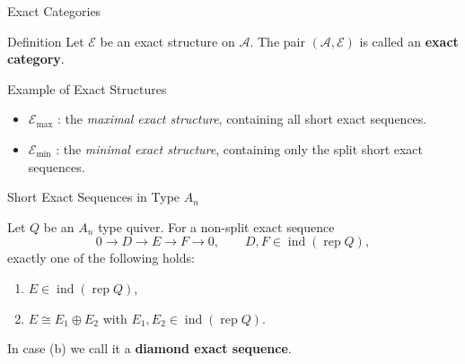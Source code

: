 \documentclass[t]{beamer}
\theoremstyle{plain}
\newcommand{\rep}{\operatorname{rep}}
\newcommand{\ind}{\operatorname{ind}}
\begin{document}
\begin{frame}{Exact Categories}
  \begin{block}{Definition}
    Let $\mathcal{E}$ be an exact structure on $\mathscr{A}$.  
    The pair $(\mathscr{A},\mathcal{E})$ is called an \textbf{exact category}.
  \end{block}
\pause
  \bigskip

  \begin{block}{Example of Exact Structures}
    \begin{itemize}
      \item $\mathcal{E}_{\max}$ : the \emph{maximal exact structure}, containing all short exact sequences.
      \pause
      \item $\mathcal{E}_{\min}$ : the \emph{minimal exact structure}, containing only the split short exact sequences.
    \end{itemize}
  \end{block}
\end{frame}


\begin{frame}{Short Exact Sequences in Type $A_n$}
\begin{theorem}
Let $Q$ be an $A_n$ type quiver.  
For a non-split exact sequence
\[
0 \longrightarrow D \longrightarrow E \longrightarrow F \longrightarrow 0,
\qquad D,F \in \ind(\rep Q),
\]
exactly one of the following holds:
\pause
\begin{enumerate}[label=(\alph*)]
  \item $E \in \ind(\rep Q)$, 
\pause
  \item $E \cong E_1 \oplus E_2$ with $E_1,E_2 \in \ind(\rep Q)$.
\end{enumerate}
\smallskip
\end{theorem}
\pause
In case (b) we call it a \textbf{diamond exact sequence}.

\end{frame}

\end{document}
